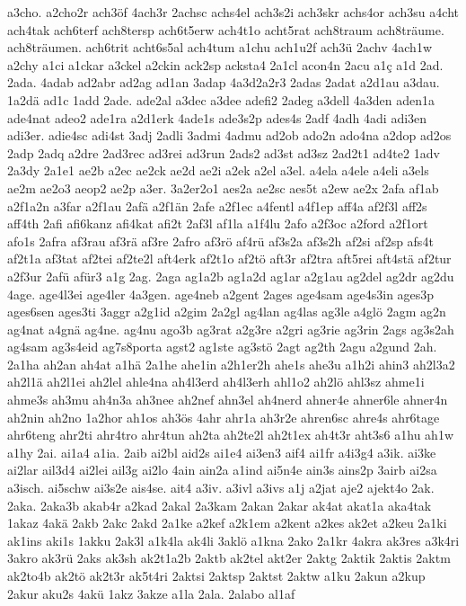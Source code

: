 {a3cho.
a2cho2r
ach3öf
4ach3r
2achsc
achs4el
ach3s2i
ach3skr
achs4or
ach3su
a4cht
ach4tak
ach6terf
ach8tersp
ach6t5erw
ach4t1o
acht5rat
ach8traum
ach8träume.
ach8träumen.
ach6trit
acht6s5al
ach4tum
a1chu
ach1u2f
ach3ü
2achv
4ach1w
a2chy
a1ci
a1ckar
a3ckel
a2ckin
ack2sp
acksta4
2a1cl
acon4n
2acu
a1ç
a1d
2ad.
2ada.
4adab
ad2abr
ad2ag
ad1an
3adap
4a3d2a2r3
2adas
2adat
a2d1au
a3dau.
1a2dä
ad1c
1add
2ade.
ade2al
a3dec
a3dee
adefi2
2adeg
a3dell
4a3den
aden1a
ade4nat
adeo2
ade1ra
a2d1erk
4ade1s
ade3s2p
ades4s
2adf
4adh
4adi
adi3en
adi3er.
adie4sc
adi4st
3adj
2adli
3admi
4admu
ad2ob
ado2n
ado4na
a2dop
ad2os
2adp
2adq
a2dre
2ad3rec
ad3rei
ad3run
2ads2
ad3st
ad3sz
2ad2t1
ad4te2
1adv
2a3dy
2a1e1
ae2b
a2ec
ae2ck
ae2d
ae2i
a2ek
a2el
a3el.
a4ela
a4ele
a4eli
a3els
ae2m
ae2o3
aeop2
ae2p
a3er.
3a2er2o1
aes2a
ae2sc
aes5t
a2ew
ae2x
2afa
af1ab
a2f1a2n
a3far
a2f1au
2afä
a2f1än
2afe
a2f1ec
a4fentl
a4f1ep
aff4a
af2f3l
aff2s
aff4th
2afi
afi6kanz
afi4kat
afi2t
2af3l
af1la
a1f4lu
2afo
a2f3oc
a2ford
a2f1ort
afo1s
2afra
af3rau
af3rä
af3re
2afro
af3rö
af4rü
af3s2a
af3s2h
af2si
af2sp
afs4t
af2t1a
af3tat
af2tei
af2te2l
aft4erk
af2t1o
af2tö
aft3r
af2tra
aft5rei
aft4stä
af2tur
a2f3ur
2afü
afür3
a1g
2ag.
2aga
ag1a2b
ag1a2d
ag1ar
a2g1au
ag2del
ag2dr
ag2du
4age.
age4l3ei
age4ler
4a3gen.
age4neb
a2gent
2ages
age4sam
age4s3in
ages3p
ages6sen
ages3ti
3aggr
a2g1id
a2gim
2a2gl
ag4lan
ag4las
ag3le
a4glö
2agm
ag2n
ag4nat
a4gnä
ag4ne.
ag4nu
ago3b
ag3rat
a2g3re
a2gri
ag3rie
ag3rin
2ags
ag3s2ah
ag4sam
ag3s4eid
ag7s8porta
agst2
ag1ste
ag3stö
2agt
ag2th
2agu
a2gund
2ah.
2a1ha
ah2an
ah4at
a1hä
2a1he
ahe1in
a2h1er2h
ahe1s
ahe3u
a1h2i
ahin3
ah2l3a2
ah2l1ä
ah2l1ei
ah2lel
ahle4na
ah4l3erd
ah4l3erh
ahl1o2
ah2lö
ahl3sz
ahme1i
ahme3s
ah3mu
ah4n3a
ah3nee
ah2nef
ahn3el
ah4nerd
ahner4e
ahner6le
ahner4n
ah2nin
ah2no
1a2hor
ah1os
ah3ös
4ahr
ahr1a
ah3r2e
ahren6sc
ahre4s
ahr6tage
ahr6teng
ahr2ti
ahr4tro
ahr4tun
ah2ta
ah2te2l
ah2t1ex
ah4t3r
aht3s6
a1hu
ah1w
a1hy
2ai.
ai1a4
a1ia.
2aib
ai2bl
aid2s
ai1e4
ai3en3
aif4
ai1fr
a4i3g4
a3ik.
ai3ke
ai2lar
ail3d4
ai2lei
ail3g
ai2lo
4ain
ain2a
a1ind
ai5n4e
ain3s
ains2p
3airb
ai2sa
a3isch.
ai5schw
ai3s2e
ais4se.
ait4
a3iv.
a3ivl
a3ivs
a1j
a2jat
aje2
ajekt4o
2ak.
2aka.
2aka3b
akab4r
a2kad
2akal
2a3kam
2akan
2akar
ak4at
akat1a
aka4tak
1akaz
4akä
2akb
2akc
2akd
2a1ke
a2kef
a2k1em
a2kent
a2kes
ak2et
a2keu
2a1ki
ak1ins
aki1s
1akku
2ak3l
a1k4la
ak4li
3aklö
a1kna
2ako
2a1kr
4akra
ak3res
a3k4ri
3akro
ak3rü
2aks
ak3sh
ak2t1a2b
2aktb
ak2tel
akt2er
2aktg
2aktik
2aktis
2aktm
ak2to4b
ak2tö
ak2t3r
ak5t4ri
2aktsi
2aktsp
2aktst
2aktw
a1ku
2akun
a2kup
2akur
aku2s
4akü
1akz
3akze
a1la
2ala.
2alabo
al1af
}
